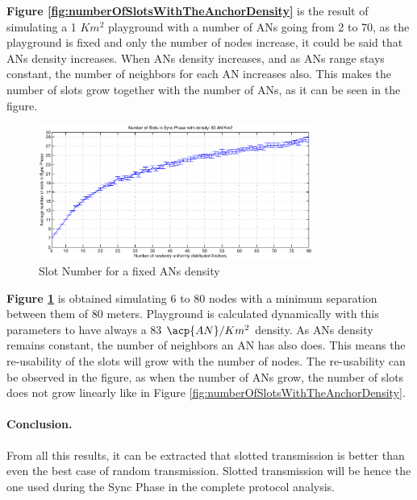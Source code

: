 \textbf{Figure \ref{fig:numberOfSlotsWithTheAnchorDensity}} is the result of simulating a 1 $Km^2$ playground with a number of \acp{AN} going from 
2 to 70, as the playground is fixed and only the number of nodes increase, it could be said that \acp{AN} density increases. When \acp{AN} density 
increases, and as \acp{AN} range stays constant, the number of neighbors for each \ac{AN} increases also. This makes the number of slots grow together
with the number of \acp{AN}, as it can be seen in the figure.

\begin{figure}[ht]
 \begin{center}
  \includegraphics[width=0.8\textwidth]{numberOfSlotsWithTheSameDensity.eps}
 \end{center}
 \caption{Slot Number for a fixed \acp{AN} density}
 \label{fig:numberOfSlotsWithTheSameDensity}
\end{figure}

\textbf{Figure \ref{fig:numberOfSlotsWithTheSameDensity}} is obtained simulating 6 to 80 nodes with a minimum separation between them of 
80 meters. Playground is calculated dynamically with this parameters to have always a 83 $\acp{AN}/Km^2$ density. As \acp{AN} density remains constant,
the number of neighbors an \ac{AN} has also does. This means the re-usability of the slots will grow with the number of nodes. The re-usability can be
observed in the figure, as when the number of \acp{AN} grow, the number of slots does not grow linearly like in Figure 
\ref{fig:numberOfSlotsWithTheAnchorDensity}.

\paragraph{Conclusion.} From all this results, it can be extracted that slotted transmission is better than even the best case of random transmission. 
Slotted transmission will be hence the one used during the Sync Phase in the complete protocol analysis.


